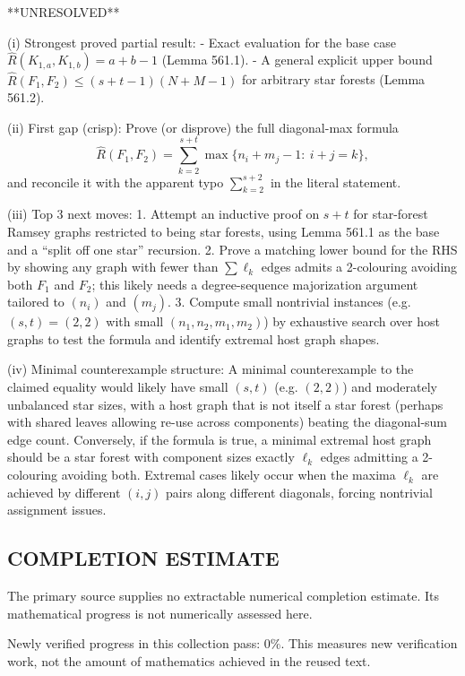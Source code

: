 **UNRESOLVED**

(i) Strongest proved partial result:
- Exact evaluation for the base case $\hat{R}(K_{1,a},K_{1,b})=a+b-1$ (Lemma 561.1).
- A general explicit upper bound $\hat{R}(F_1,F_2)\le (s+t-1)(N+M-1)$ for arbitrary star forests (Lemma 561.2).

(ii) First gap (crisp):
Prove (or disprove) the full diagonal-max formula
\[
\hat{R}(F_1,F_2)=\sum_{k=2}^{s+t} \max\{n_i+m_j-1:\ i+j=k\},
\]
and reconcile it with the apparent typo $\sum_{k=2}^{s+2}$ in the literal statement.

(iii) Top 3 next moves:
1. Attempt an inductive proof on $s+t$ for star-forest Ramsey graphs restricted to being star forests, using Lemma 561.1 as the base and a ``split off one star'' recursion.
2. Prove a matching lower bound for the RHS by showing any graph with fewer than $\sum \ell_k$ edges admits a 2-colouring avoiding both $F_1$ and $F_2$; this likely needs a degree-sequence majorization argument tailored to $(n_i)$ and $(m_j)$.
3. Compute small nontrivial instances (e.g. $(s,t)=(2,2)$ with small $(n_1,n_2,m_1,m_2)$) by exhaustive search over host graphs to test the formula and identify extremal host graph shapes.

(iv) Minimal counterexample structure:
A minimal counterexample to the claimed equality would likely have small $(s,t)$ (e.g. $(2,2)$) and moderately unbalanced star sizes, with a host graph that is not itself a star forest (perhaps with shared leaves allowing re-use across components) beating the diagonal-sum edge count. Conversely, if the formula is true, a minimal extremal host graph should be a star forest with component sizes exactly $\ell_k$ edges admitting a 2-colouring avoiding both. Extremal cases likely occur when the maxima $\ell_k$ are achieved by different $(i,j)$ pairs along different diagonals, forcing nontrivial assignment issues.



\subsection*{COMPLETION ESTIMATE}
The primary source supplies no extractable numerical completion estimate. Its mathematical progress is not numerically assessed here.

Newly verified progress in this collection pass: $0\%$. This measures new verification work, not the amount of mathematics achieved in the reused text.
